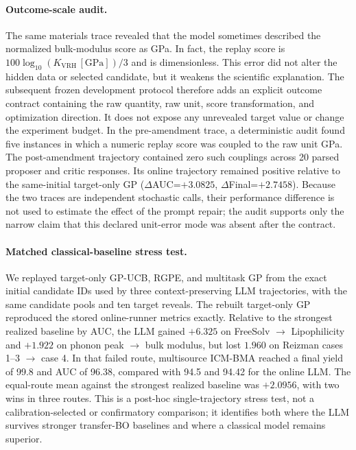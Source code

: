 \paragraph{Outcome-scale audit.}
The same materials trace revealed that the model sometimes described the
normalized bulk-modulus score as GPa. In fact, the replay score is
$100\log_{10}(K_{\mathrm{VRH}}\,[\mathrm{GPa}])/3$ and is dimensionless. This
error did not alter the hidden data or selected candidate, but it weakens the
scientific explanation. The subsequent frozen development protocol therefore
adds an explicit outcome contract containing the raw quantity, raw unit, score
transformation, and optimization direction. It does not expose any unrevealed
target value or change the experiment budget.
In the pre-amendment trace, a deterministic audit found five instances in
which a numeric replay score was coupled to the raw unit GPa. The post-amendment
trajectory contained zero such couplings across 20 parsed proposer and critic
responses. Its online trajectory remained positive relative to the same-initial
target-only GP ($\Delta$AUC=$+3.0825$, $\Delta$Final=$+2.7458$). Because the two
traces are independent stochastic calls, their performance difference is not
used to estimate the effect of the prompt repair; the audit supports only the
narrow claim that this declared unit-error mode was absent after the contract.

\paragraph{Matched classical-baseline stress test.}
We replayed target-only GP-UCB, RGPE, and multitask GP from the exact initial
candidate IDs used by three context-preserving LLM trajectories, with the same
candidate pools and ten target reveals. The rebuilt target-only GP reproduced
the stored online-runner metrics exactly. Relative to the strongest realized
baseline by AUC, the LLM gained $+6.325$ on FreeSolv $\rightarrow$
Lipophilicity and $+1.922$ on phonon peak $\rightarrow$ bulk modulus, but lost
$1.960$ on Reizman cases 1--3 $\rightarrow$ case 4. In that failed route,
multisource ICM-BMA reached a final yield of 99.8 and AUC of 96.38, compared
with 94.5 and 94.42 for the online LLM. The equal-route mean against the
strongest realized baseline was $+2.0956$, with two wins in three routes. This
is a post-hoc single-trajectory stress test, not a calibration-selected or
confirmatory comparison; it identifies both where the LLM survives stronger
transfer-BO baselines and where a classical model remains superior.

